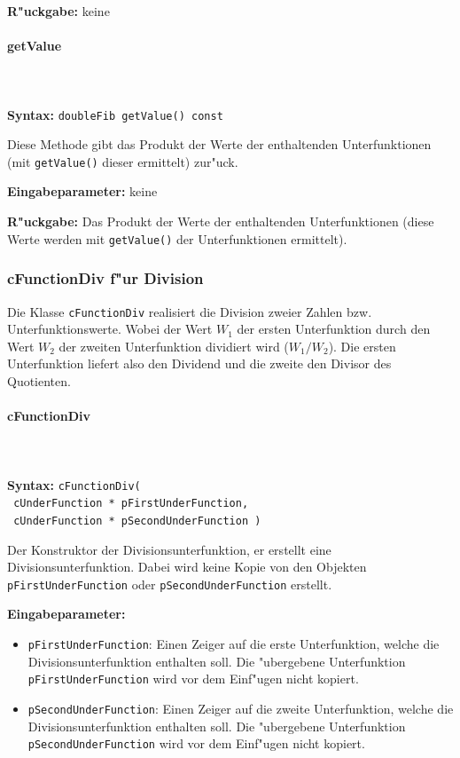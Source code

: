 \bigskip\noindent
\textbf{R"uckgabe:} keine


\paragraph{getValue}

\ \\\\\noindent
\textbf{Syntax:} \verb|doubleFib getValue() const|

\bigskip\noindent
Diese Methode gibt das Produkt der Werte der enthaltenden Unterfunktionen (mit \verb|getValue()| dieser ermittelt) zur"uck.

\bigskip\noindent
\textbf{Eingabeparameter:} keine

\bigskip\noindent
\textbf{R"uckgabe:} Das Produkt der Werte der enthaltenden Unterfunktionen (diese Werte werden mit \verb|getValue()| der Unterfunktionen ermittelt).


\subsubsection{cFunctionDiv f"ur Division}

Die Klasse \verb|cFunctionDiv| realisiert die Division zweier Zahlen bzw. Unterfunktionswerte. Wobei der Wert $W_1$ der ersten Unterfunktion durch den Wert $W_2$ der zweiten Unterfunktion dividiert wird ($W_1/W_2$). Die ersten Unterfunktion liefert also den Dividend und die zweite den Divisor des Quotienten.

\paragraph{cFunctionDiv}

\ \\\\\noindent
\textbf{Syntax:} \verb|cFunctionDiv(| \\\verb| cUnderFunction * pFirstUnderFunction,| \\\verb| cUnderFunction * pSecondUnderFunction )|

\bigskip\noindent
Der Konstruktor der Divisionsunterfunktion, er erstellt eine Divisionsunterfunktion. Dabei wird keine Kopie von den Objekten \verb|pFirstUnderFunction| oder \verb|pSecondUnderFunction| erstellt.

\bigskip\noindent
\textbf{Eingabeparameter:}
\begin{itemize}
 \item \verb|pFirstUnderFunction|: Einen Zeiger auf die erste Unterfunktion, welche die Divisionsunterfunktion enthalten soll. Die "ubergebene Unterfunktion \verb|pFirstUnderFunction| wird vor dem Einf"ugen nicht kopiert.
 \item \verb|pSecondUnderFunction|: Einen Zeiger auf die zweite Unterfunktion, welche die Divisionsunterfunktion enthalten soll. Die "ubergebene Unterfunktion \verb|pSecondUnderFunction| wird vor dem Einf"ugen nicht kopiert.
\end{itemize}

